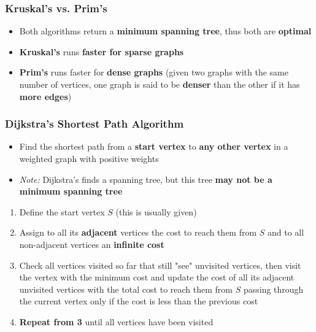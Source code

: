 \subsubsection{Kruskal's vs. Prim's}
\begin{itemize}
  \item Both algorithms return a \textbf{minimum spanning tree}, thus both are \textbf{optimal}
  \item \textbf{Kruskal's} runs \textbf{faster for sparse graphs}
  \item \textbf{Prim's} runs faster for \textbf{dense graphs} (given two graphs with the same number of vertices, one graph is said to be \textbf{denser} than the other if it has \textbf{more edges})
\end{itemize}

\subsubsection{Dijkstra's Shortest Path Algorithm}
\begin{itemize}
  \item Find the shortest path from a \textbf{start vertex} to \textbf{any other vertex} in a weighted graph with positive weights
  \item \textit{Note:} Dijkstra's finds a spanning tree, but this tree \textbf{may not be a minimum spanning tree}
\end{itemize}

\begin{enumerate}
  \item Define the start vertex $S$ (this is usually given)
  \item Assign to all its \textbf{adjacent} vertices the cost to reach them from $S$ and to all non-adjacent vertices an \textbf{infinite cost}
  \item Check all vertices visited so far that still "see" unvisited vertices, then visit the vertex with the minimum cost and update the cost of all its adjacent unvisited vertices with the total cost to reach them from $S$ passing through the current vertex only if the cost is less than the previous cost
  \item \textbf{Repeat from 3} until all vertices have been visited
\end{enumerate}
